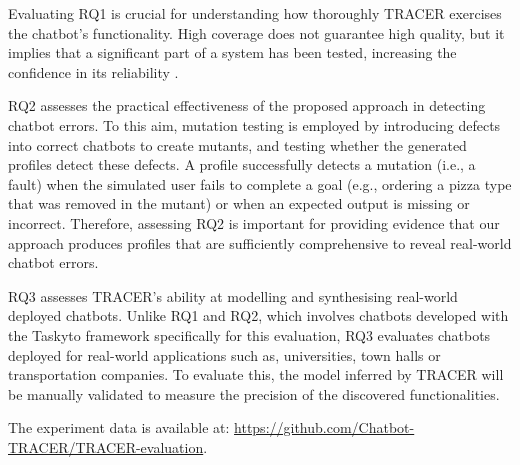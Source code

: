 Evaluating RQ1 is crucial for understanding
how thoroughly \ac{TRACER} exercises the chatbot’s functionality.
High coverage does not guarantee high quality,
but it implies that a significant part of a system has been tested,
increasing the confidence in its reliability
\autocite{ammannIntroductionSoftwareTesting2017}.


RQ2 assesses the practical effectiveness
of the proposed approach in detecting chatbot errors.
To this aim, mutation testing is employed
\autocite{demilloHintsTestData1978}
by introducing defects into correct chatbots to create mutants,
and testing whether the generated profiles detect these defects.
A profile successfully detects a mutation (i.e., a fault)
when the simulated user fails to complete a goal
(e.g., ordering a pizza type that was removed in the mutant)
or when an expected output is missing or incorrect.
Therefore, assessing RQ2 is important
for providing evidence that our approach produces
profiles that are sufficiently comprehensive
to reveal real-world chatbot errors.

RQ3 assesses \ac{TRACER}'s ability at modelling and synthesising
real-world deployed chatbots.
Unlike RQ1 and RQ2, which involves chatbots developed with the Taskyto framework
specifically for this evaluation,
RQ3 evaluates chatbots deployed for real-world applications
such as, universities, town halls or transportation companies.
To evaluate this, the model inferred by \ac{TRACER}
will be manually validated to measure the precision
of the discovered functionalities.

The experiment data is available at:
\url{https://github.com/Chatbot-TRACER/TRACER-evaluation}.




